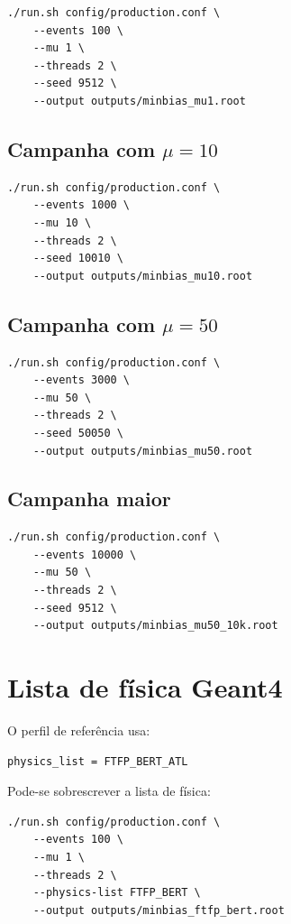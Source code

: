 \documentclass[11pt,a4paper]{article}
\begin{document}
\begin{lstlisting}[style=shell]
./run.sh config/production.conf \
    --events 100 \
    --mu 1 \
    --threads 2 \
    --seed 9512 \
    --output outputs/minbias_mu1.root
\end{lstlisting}

\subsection{Campanha com \texorpdfstring{$\mu=10$}{mu=10}}

\begin{lstlisting}[style=shell]
./run.sh config/production.conf \
    --events 1000 \
    --mu 10 \
    --threads 2 \
    --seed 10010 \
    --output outputs/minbias_mu10.root
\end{lstlisting}

\subsection{Campanha com \texorpdfstring{$\mu=50$}{mu=50}}

\begin{lstlisting}[style=shell]
./run.sh config/production.conf \
    --events 3000 \
    --mu 50 \
    --threads 2 \
    --seed 50050 \
    --output outputs/minbias_mu50.root
\end{lstlisting}

\subsection{Campanha maior}

\begin{lstlisting}[style=shell]
./run.sh config/production.conf \
    --events 10000 \
    --mu 50 \
    --threads 2 \
    --seed 9512 \
    --output outputs/minbias_mu50_10k.root
\end{lstlisting}

\section{Lista de física Geant4}

O perfil de referência usa:

\begin{lstlisting}[style=config]
physics_list = FTFP_BERT_ATL
\end{lstlisting}

Pode-se sobrescrever a lista de física:

\begin{lstlisting}[style=shell]
./run.sh config/production.conf \
    --events 100 \
    --mu 1 \
    --threads 2 \
    --physics-list FTFP_BERT \
    --output outputs/minbias_ftfp_bert.root
\end{lstlisting}
\end{document}
